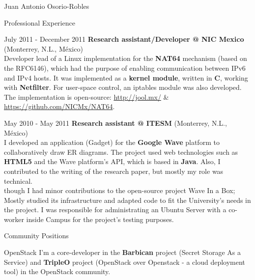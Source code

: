 \documentclass[english,10pt,letterpaper]{article}
\begin{document}
\begin{cv}{Juan Antonio Osorio-Robles}
\begin{cvlist}{Professional Experience}
		\item [July 2011 - December 2011]
            \textbf{Research assistant/Developer @ NIC Mexico} (Monterrey,
            N.L., M\'{e}xico)\\
            Developer lead of a Linux implementation for the \textbf{NAT64}
            mechanism (based on the RFC6146), which had the purpose of
            enabling communication between IPv6 and IPv4 hosts. It was
            implemented as a \textbf{kernel module}, written in \textbf{C},
            working with \textbf{Netfilter}. For user-space control, an
            iptables module was also developed. The implementation is
            open-source:
            \href{http://jool.mx/}{http://jool.mx/} \&\\
            \href{https://github.com/NICMx/NAT64}{https://github.com/NICMx/NAT64}.

		\item [May 2010 - May 2011]
            \textbf{Research assistant @ ITESM} (Monterrey, N.L., M\'{e}xico)\\
            I developed an application (Gadget) for the \textbf{Google Wave}
            platform to collaboratively draw ER diagrams. The project used web
            technologies such as \textbf{HTML5} and the Wave platform's API,
            which is based in \textbf{Java}. Also, I contributed to the
            writing of the research paper, but mostly my role was technical.\\

            though I had minor contributions to the open-source project Wave In
            a Box; Mostly studied its infrastructure and adapted code to fit
            the University's needs in the project. I was responsible for
            administrating an Ubuntu Server with a co-worker inside Campus for
            the project's testing purposes.

	\end{cvlist}

    \begin{cvlist}{Community Positions}
		\item [OpenStack]
            I'm a core-developer in the \textbf{Barbican} project (Secret
            Storage As a Service) and \textbf{TripleO} project (OpenStack
            over Openstack - a cloud deployment tool) in the OpenStack
            community.
	\end{cvlist}


\end{cv}
\end{document}
